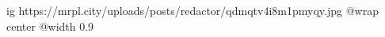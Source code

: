  
 
 
 
 

\ifcmt
  ig https://mrpl.city/uploads/posts/redactor/qdmqtv4i8m1pmyqy.jpg
  @wrap center
  @width 0.9
\fi
